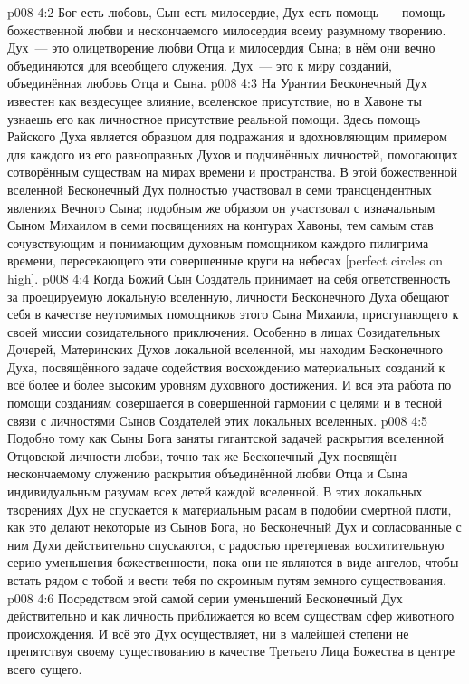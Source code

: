 \vs p008 4:2 Бог есть любовь, Сын есть милосердие, Дух есть помощь~--- помощь божественной любви и нескончаемого милосердия всему разумному творению. Дух~--- это олицетворение любви Отца и милосердия Сына; в нём они вечно объединяются для всеобщего служения. Дух~--- это  к миру созданий, объединённая любовь Отца и Сына.
\vs p008 4:3 На Урантии Бесконечный Дух известен как вездесущее влияние, вселенское присутствие, но в Хавоне ты узнаешь его как личностное присутствие реальной помощи. Здесь помощь Райского Духа является образцом для подражания и вдохновляющим примером для каждого из его равноправных Духов и подчинённых личностей, помогающих сотворённым существам на мирах времени и пространства. В этой божественной вселенной Бесконечный Дух полностью участвовал в семи трансцендентных явлениях Вечного Сына; подобным же образом он участвовал с изначальным Сыном Михаилом в семи посвящениях на контурах Хавоны, тем самым став сочувствующим и понимающим духовным помощником каждого пилигрима времени, пересекающего эти совершенные круги на небесах [perfect circles on high].
\vs p008 4:4 \pc Когда Божий Сын Создатель принимает на себя ответственность за проецируемую локальную вселенную, личности Бесконечного Духа обещают себя в качестве неутомимых помощников этого Сына Михаила, приступающего к своей миссии созидательного приключения. Особенно в лицах Созидательных Дочерей, Материнских Духов локальной вселенной, мы находим Бесконечного Духа, посвящённого задаче содействия восхождению материальных созданий к всё более и более высоким уровням духовного достижения. И вся эта работа по помощи созданиям совершается в совершенной гармонии с целями и в тесной связи с личностями Сынов Создателей этих локальных вселенных.
\vs p008 4:5 Подобно тому как Сыны Бога заняты гигантской задачей раскрытия вселенной Отцовской личности любви, точно так же Бесконечный Дух посвящён нескончаемому служению раскрытия объединённой любви Отца и Сына индивидуальным разумам всех детей каждой вселенной. В этих локальных творениях Дух не спускается к материальным расам в подобии смертной плоти, как это делают некоторые из Сынов Бога, но Бесконечный Дух и согласованные с ним Духи действительно спускаются, с радостью претерпевая восхитительную серию уменьшения божественности, пока они не являются в виде ангелов, чтобы встать рядом с тобой и вести тебя по скромным путям земного существования.
\vs p008 4:6 Посредством этой самой серии уменьшений Бесконечный Дух действительно и как личность приближается ко всем существам сфер животного происхождения. И всё это Дух осуществляет, ни в малейшей степени не препятствуя своему существованию в качестве Третьего Лица Божества в центре всего сущего.
